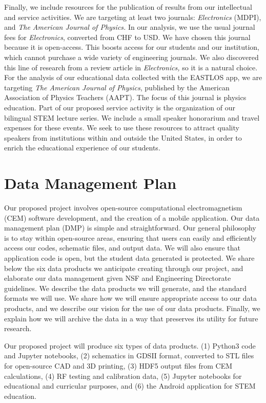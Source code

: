\documentclass[10pt]{amsart}
\theoremstyle{definition}
\numberwithin{equation}{section}
\begin{document}
Finally, we include resources for the publication of results from our intellectual and service activities.  We are targeting at least two journals: \textit{Electronics} (MDPI), and \textit{The American Journal of Physics.} In our analysis, we use the usual journal fees for \textit{Electronics}, converted from CHF to USD.  We have chosen this journal because it is open-access.  This boosts access for our students and our institution, which cannot purchase a wide variety of engineering journals.  We also discovered this line of research from a review article in \textit{Electronics,} so it is a natural choice.  For the analysis of our educational data collected with the EASTLOS app, we are targeting \textit{The American Journal of Physics}, published by the American Association of Physics Teachers (AAPT).  The focus of this journal is physics education.  Part of our proposed service activity is the organization of our bilingual STEM lecture series.  We include a small speaker honorarium and travel expenses for these events.  We seek to use these resources to attract quality speakers from institutions within and outside the United States, in order to enrich the educational experience of our students.

\section{Data Management Plan}

Our proposed project involves open-source computational electromagnetism (CEM) software development, and the creation of a mobile application.  Our data management plan (DMP) is simple and straightforward.  Our general philosophy is to stay within open-source areas, ensuring that users can easily and efficiently access our codes, schematic files, and output data.  We will also ensure that application code is open, but the student data generated is protected.  We share below the six data products we anticipate creating through our project, and elaborate our data management given NSF and Engineering Directorate guidelines.  We describe the data products we will generate, and the standard formats we will use.  We share how we will ensure appropriate access to our data products, and we describe our vision for the use of our data products.  Finally, we explain how we will archive the data in a way that preserves its utility for future research. 

Our proposed project will produce six types of data products. (1) Python3 code and Jupyter notebooks, (2) schematics in GDSII format, converted to STL files for open-source CAD and 3D printing, (3) HDF5 output files from CEM calculations, (4) RF testing and calibration data, (5) Jupyter notebooks for educational and curricular purposes, and (6) the Android application for STEM education. 
\end{document}
